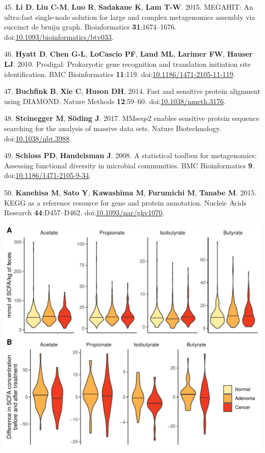 \documentclass[11pt,]{article}
\begin{document}
\leavevmode\hypertarget{ref-Li2015}{}%
45. \textbf{Li D}, \textbf{Liu C-M}, \textbf{Luo R}, \textbf{Sadakane
K}, \textbf{Lam T-W}. 2015. MEGAHIT: An ultra-fast single-node solution
for large and complex metagenomics assembly via succinct de bruijn
graph. Bioinformatics \textbf{31}:1674--1676.
doi:\href{https://doi.org/10.1093/bioinformatics/btv033}{10.1093/bioinformatics/btv033}.

\leavevmode\hypertarget{ref-Hyatt2010}{}%
46. \textbf{Hyatt D}, \textbf{Chen G-L}, \textbf{LoCascio PF},
\textbf{Land ML}, \textbf{Larimer FW}, \textbf{Hauser LJ}. 2010.
Prodigal: Prokaryotic gene recognition and translation initiation site
identification. BMC Bioinformatics \textbf{11}:119.
doi:\href{https://doi.org/10.1186/1471-2105-11-119}{10.1186/1471-2105-11-119}.

\leavevmode\hypertarget{ref-Buchfink2014}{}%
47. \textbf{Buchfink B}, \textbf{Xie C}, \textbf{Huson DH}. 2014. Fast
and sensitive protein alignment using DIAMOND. Nature Methods
\textbf{12}:59--60.
doi:\href{https://doi.org/10.1038/nmeth.3176}{10.1038/nmeth.3176}.

\leavevmode\hypertarget{ref-Steinegger2017}{}%
48. \textbf{Steinegger M}, \textbf{Söding J}. 2017. MMseqs2 enables
sensitive protein sequence searching for the analysis of massive data
sets. Nature Biotechnology.
doi:\href{https://doi.org/10.1038/nbt.3988}{10.1038/nbt.3988}.

\leavevmode\hypertarget{ref-Schloss2008}{}%
49. \textbf{Schloss PD}, \textbf{Handelsman J}. 2008. A statistical
toolbox for metagenomics: Assessing functional diversity in microbial
communities. BMC Bioinformatics \textbf{9}.
doi:\href{https://doi.org/10.1186/1471-2105-9-34}{10.1186/1471-2105-9-34}.

\leavevmode\hypertarget{ref-Kanehisa2015}{}%
50. \textbf{Kanehisa M}, \textbf{Sato Y}, \textbf{Kawashima M},
\textbf{Furumichi M}, \textbf{Tanabe M}. 2015. KEGG as a reference
resource for gene and protein annotation. Nucleic Acids Research
\textbf{44}:D457--D462.
doi:\href{https://doi.org/10.1093/nar/gkv1070}{10.1093/nar/gkv1070}.

\newpage

\includegraphics{../results/figures/scfa_abundance.pdf}
\end{document}
